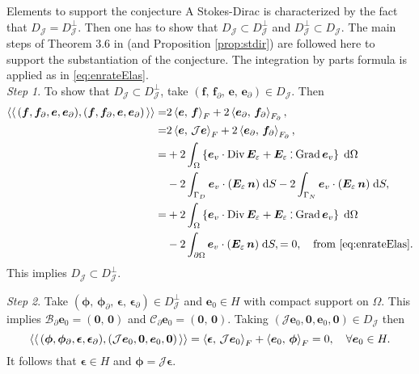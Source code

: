 \begin{paragraph}{Elements to support the conjecture}
	A Stokes-Dirac is characterized by the fact that ${D}_{\mathcal{J}} = {D}_{\mathcal{J}}^\perp$. Then one has to show that ${D}_{\mathcal{J}} \subset {D}_{\mathcal{J}}^\perp$ and ${D}_{\mathcal{J}}^\perp \subset {D}_{\mathcal{J}}$. The main steps of Theorem 3.6 in \cite{legorrec2005} (and Proposition \ref{prop:stdir}) are followed here to support the substantiation of the conjecture. The integration by parts formula is applied as in \eqref{eq:enrateElas}. \\
	
	\textit{Step 1}. To show that ${D}_{\mathcal{J}} \subset {D}_{\mathcal{J}}^\perp$, take $(\bm{f}, \, \bm{f}_\partial, \, \bm{e}, \, \bm{e}_\partial) \in {D}_{\mathcal{J}}$. Then
	\begin{align*}
	\bilprod{(\bm{f}, \bm{f}_{\partial}, \bm{e}, \bm{e}_{\partial})}{(\bm{f}, \bm{f}_{\partial}, \bm{e}, \bm{e}_{\partial})} =& 2 \inner[F]{\bm{e}}{\bm{f}} + 2 \inner[F_\partial]{\bm{e}_{\partial}}{\bm{f}_{\partial}}, \\
	=& 2 \inner[F]{\bm{e}}{\mathcal{J}\bm{e}} + 2 \inner[F_\partial]{\bm{e}_{\partial}}{\bm{f}_{\partial}}, \\
	=& + 2 \int_{\Omega} \left\{\bm{e}_v \cdot \Div \bm{E}_\varepsilon + \bm{E}_\varepsilon \cddot \Grad \bm{e}_v \right\}\d\Omega\\
	&- 2 \int_{\Gamma_D} \bm{e}_v \cdot (\bm{E}_\varepsilon \, \bm{n}) \d{S} - 2 \int_{\Gamma_N} \bm{e}_v \cdot (\bm{E}_\varepsilon \, \bm{n}) \d{S}, \\
	=& + 2 \int_{\Omega} \left\{\bm{e}_v \cdot \Div \bm{E}_\varepsilon + \bm{E}_\varepsilon \cddot \Grad \bm{e}_v \right\}\d\Omega\\
	& - 2 \int_{\partial\Omega} \bm{e}_v \cdot (\bm{E}_\varepsilon \, \bm{n}) \d{S},
	= 0, \quad \text{from \eqref{eq:enrateElas}}.
	\end{align*}
	This implies ${D}_{\mathcal{J}} \subset {D}_{\mathcal{J}}^\perp$.
	
	\textit{Step 2}. Take $(\bm{\phi}, \, \bm{\phi}_\partial, \, \bm{\epsilon}, \, \bm{\epsilon}_\partial) \in {D}_{\mathcal{J}}^\perp$ and $\bm{e}_0 \in H$ with compact support on $\Omega$. This implies $\mathcal{B}_\partial \bm{e}_0 = (\bm{0},\, \bm{0})$ and $\mathcal{C}_\partial \bm{e}_0 = (\bm{0},\, \bm{0})$. Taking $(\mathcal{J}\bm{e}_0, \bm{0}, \bm{e}_0, \bm{0}) \in {D}_{\mathcal{J}}$ then 
	\begin{equation*}
	\bilprod{(\bm{\phi}, \bm{\phi}_\partial,  \bm{\epsilon}, \bm{\epsilon}_\partial)}{(\mathcal{J}\bm{e}_0, \bm{0}, \bm{e}_0, \bm{0})} = \inner[F]{\bm{\epsilon}}{\mathcal{J}\bm{e}_0} + \inner[F]{\bm{e}_0}{\bm{\phi}} = 0, \quad \forall \bm{e}_0 \in H.
	\end{equation*}
	It follows that $\bm{\epsilon} \in H$ and $\bm{\phi}=\mathcal{J}\bm{\epsilon}$. \\
	

\end{paragraph}

